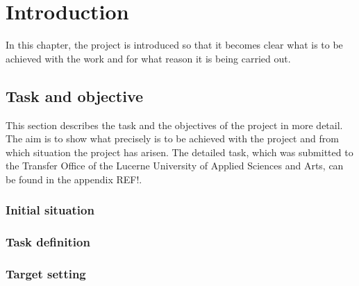 \chapter{Introduction}
\label{ch:Introduction}

In this chapter, the project is introduced so that it becomes clear what is to be achieved with the work and for what reason it is being carried out.

\section{Task and objective}
\label{sec:Task-Objective}

This section describes the task and the objectives of the project in more detail. The aim is to show what precisely is to be achieved with the project and from which situation the project has arisen. The detailed task, which was submitted to the Transfer Office of the Lucerne University of Applied Sciences and Arts, can be found in the appendix REF!.

\subsection{Initial situation}
\label{sub:Initial-Stituation}

\subsection{Task definition}
\label{sub:Task-Definition}

\subsection{Target setting}
\label{sub:Target-Setting}